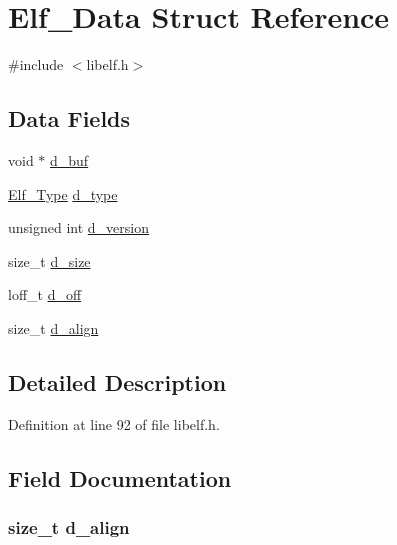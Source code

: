 \hypertarget{struct_elf___data}{\section{\-Elf\-\_\-\-Data \-Struct \-Reference}
\label{struct_elf___data}
}


{\ttfamily \#include $<$libelf.\-h$>$}

\subsection*{\-Data \-Fields}
\begin{DoxyCompactItemize}
\item 
void $\ast$ \hyperlink{struct_elf___data_a1359b01d51e81c439649e50e0228dbd7}{d\-\_\-buf}
\item 
\hyperlink{libelf_8h_ae705110a6320d7ca1cd35cf11ecabde3}{\-Elf\-\_\-\-Type} \hyperlink{struct_elf___data_a376952c5e9c01e467788dcfc62216771}{d\-\_\-type}
\item 
unsigned int \hyperlink{struct_elf___data_a39da3806e0e01d780fd0d28a05e36038}{d\-\_\-version}
\item 
size\-\_\-t \hyperlink{struct_elf___data_a30bc3455be56d05848d0a0f737d72cf5}{d\-\_\-size}
\item 
loff\-\_\-t \hyperlink{struct_elf___data_a76ed4b4aeb474d605e84a4320f054248}{d\-\_\-off}
\item 
size\-\_\-t \hyperlink{struct_elf___data_a5416f794178e8e752bc27b3e2751827e}{d\-\_\-align}
\end{DoxyCompactItemize}


\subsection{\-Detailed \-Description}


\-Definition at line 92 of file libelf.\-h.



\subsection{\-Field \-Documentation}
\hypertarget{struct_elf___data_a5416f794178e8e752bc27b3e2751827e}{
\subsubsection[{d\-\_\-align}]{\setlength{\rightskip}{0pt plus 5cm}size\-\_\-t {\bf d\-\_\-align}}}\label{struct_elf___data_a5416f794178e8e752bc27b3e2751827e}


